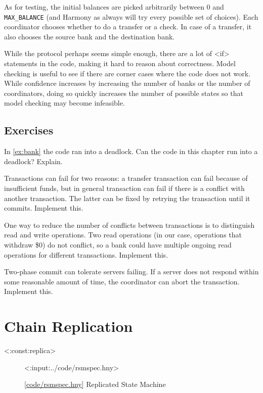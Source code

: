 \documentclass{report}
\newcommand{\harmonylink}[1]{%
[\href{https://harmony.cs.cornell.edu/#1}{\underline{#1}}]%
}
\newenvironment{code}{
\tcolorbox
}{
\endtcolorbox
}
\begin{document}
As for testing, the initial balances are picked arbitrarily between
0 and \texttt{MAX\_BALANCE} (and Harmony as always will try every
possible set of choices).
Each coordinator chooses whether to do a transfer or a check.  In
case of a transfer, it also chooses the source bank and the destination
bank.

While the protocol perhaps seems simple enough, there are a lot of
<{if}> statements in the code, making it hard to reason about
correctness.
Model checking is useful to see if there are corner
cases where the code does not work.
While confidence increases by
increasing the number of banks or the number of coordinators, doing so
quickly increases the number of possible states so that model checking
may become infeasible.

\section*{Exercises}
\begin{problems}
\item In \autoref{ex:bank} the code ran into a deadlock.  Can the code
in this chapter run into a deadlock?  Explain.
\item Transactions can fail for two reasons: a transfer transaction can
fail because of insufficient funds, but in general transaction can fail
if there is a conflict with another transaction.  The latter can be
fixed by retrying the transaction until it commits.  Implement this.
\item One way to reduce the number of conflicts between transactions
is to distinguish read and write operations.  Two read operations
(in our case, operations that withdraw \$0) do not conflict,
so a bank could have multiple ongoing read operations
for different transactions.  Implement this.
\item Two-phase commit can tolerate servers failing.  If a server does not
respond within some reasonable amount of time, the coordinator can abort
the transaction.  Implement this.
\end{problems}

\chapter{Chain Replication}
\label{ch:chain}

<{:const:replica}>

\begin{figure}
\begin{code}
<{:input:../code/rsmspec.hny}>
\end{code}
\caption{\harmonylink{code/rsmspec.hny} Replicated State Machine}
\label{fig:rsmspec}
\end{figure}
\end{document}
